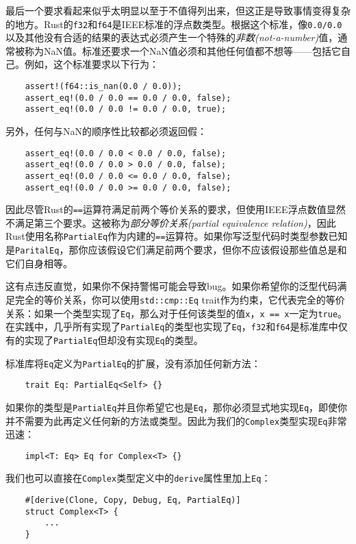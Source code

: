 最后一个要求看起来似乎太明显以至于不值得列出来，但这正是导致事情变得复杂的地方。Rust的\texttt{f32}和\texttt{f64}是IEEE标准的浮点数类型。根据这个标准，像\texttt{0.0/0.0}以及其他没有合适的结果的表达式必须产生一个特殊的\emph{非数(not-a-number)}值，通常被称为NaN值。标准还要求一个NaN值必须和其他任何值都不想等——包括它自己。例如，这个标准要求以下行为：
\begin{verbatim}
    assert!(f64::is_nan(0.0 / 0.0));
    assert_eq!(0.0 / 0.0 == 0.0 / 0.0, false);
    assert_eq!(0.0 / 0.0 != 0.0 / 0.0, true);
\end{verbatim}

另外，任何与NaN的顺序性比较都必须返回假：
\begin{verbatim}
    assert_eq!(0.0 / 0.0 < 0.0 / 0.0, false);
    assert_eq!(0.0 / 0.0 > 0.0 / 0.0, false);
    assert_eq!(0.0 / 0.0 <= 0.0 / 0.0, false);
    assert_eq!(0.0 / 0.0 >= 0.0 / 0.0, false);
\end{verbatim}

因此尽管Rust的\texttt{==}运算符满足前两个等价关系的要求，但使用IEEE浮点数值显然不满足第三个要求。这被称为\emph{部分等价关系(partial equivalence relation)}，因此Rust使用名称\texttt{PartialEq}作为内建的\texttt{==}运算符。如果你写泛型代码时类型参数已知是\texttt{ParitalEq}，那你应该假设它们满足前两个要求，但你不应该假设那些值总是和它们自身相等。

这有点违反直觉，如果你不保持警惕可能会导致bug。如果你希望你的泛型代码满足完全的等价关系，你可以使用\texttt{std::cmp::Eq} trait作为约束，它代表完全的等价关系：如果一个类型实现了\texttt{Eq}，那么对于任何该类型的值\texttt{x}，\texttt{x == x}一定为\texttt{true}。在实践中，几乎所有实现了\texttt{PartialEq}的类型也实现了\texttt{Eq}，\texttt{f32}和\texttt{f64}是标准库中仅有的实现了\texttt{PartialEq}但却没有实现\texttt{Eq}的类型。

标准库将\texttt{Eq}定义为\texttt{PartialEq}的扩展，没有添加任何新方法：
\begin{verbatim}
    trait Eq: PartialEq<Self> {}
\end{verbatim}

如果你的类型是\texttt{PartialEq}并且你希望它也是\texttt{Eq}，那你必须显式地实现\texttt{Eq}，即使你并不需要为此再定义任何新的方法或类型。因此为我们的\texttt{Complex}类型实现\texttt{Eq}非常迅速：
\begin{verbatim}
    impl<T: Eq> Eq for Complex<T> {}
\end{verbatim}

我们也可以直接在\texttt{Complex}类型定义中的\texttt{derive}属性里加上\texttt{Eq}：
\begin{verbatim}
    #[derive(Clone, Copy, Debug, Eq, PartialEq)]
    struct Complex<T> {
        ...
    }
\end{verbatim}

